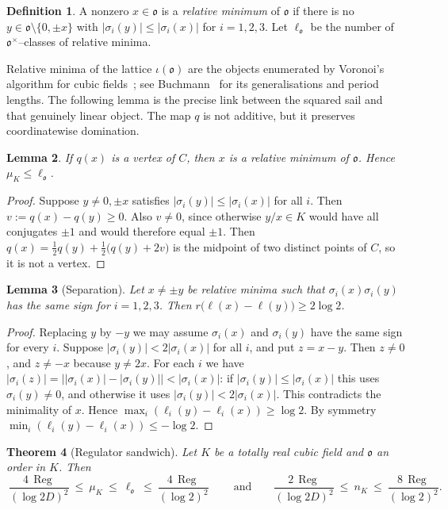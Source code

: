 \documentclass[11pt,reqno]{amsart}
\theoremstyle{plain}
\newtheorem{theorem}{Theorem}[section]
\newtheorem{lemma}[theorem]{Lemma}
\theoremstyle{definition}
\newtheorem{definition}[theorem]{Definition}
\newcommand{\Reg}{\operatorname{Reg}}
\newcommand{\Ok}{\mathfrak{o}}
\newcommand{\nK}{n_K}
\newcommand{\muK}{\mu_K}
\begin{document}
\begin{definition}
A nonzero $x\in\Ok$ is a \emph{relative minimum} of $\Ok$ if there is no $y\in\Ok\setminus\{0,\pm x\}$ with
$|\sigma_i(y)|\le|\sigma_i(x)|$ for $i=1,2,3$. Let $\ell_\Ok$ be the number of $\Ok^\times$--classes of
relative minima.
\end{definition}

Relative minima of the lattice $\iota(\Ok)$ are the objects enumerated by Voronoi's algorithm for cubic
fields~\cite{Voronoi1896,DF}; see Buchmann~\cite{Buchmann85,Buchmann87} for its generalisations and period
lengths. The following lemma is the precise link between the squared sail and that genuinely linear
object. The map $q$ is not additive, but it preserves coordinatewise domination.

\begin{lemma}\label{lem:relmin}
If $q(x)$ is a vertex of $C$, then $x$ is a relative minimum of $\Ok$. Hence $\muK\le\ell_\Ok$.
\end{lemma}

\begin{proof}
Suppose $y\ne0,\pm x$ satisfies $|\sigma_i(y)|\le|\sigma_i(x)|$ for all $i$. Then $v:=q(x)-q(y)\ge0$. Also
$v\neq0$, since otherwise $y/x\in K$ would have all conjugates $\pm1$ and would therefore equal $\pm1$. Then
$q(x)=\tfrac12q(y)+\tfrac12\big(q(y)+2v\big)$ is the midpoint of two distinct points of $C$, so it is not a
vertex.
\end{proof}

\begin{lemma}[Separation]\label{lem:sep}
Let $x\neq\pm y$ be relative minima such that $\sigma_i(x)\sigma_i(y)$ has the same sign for $i=1,2,3$. Then
$r\big(\ell(x)-\ell(y)\big)\ge2\log2$.
\end{lemma}

\begin{proof}
Replacing $y$ by $-y$ we may assume $\sigma_i(x)$ and $\sigma_i(y)$ have the same sign for every $i$.
Suppose $|\sigma_i(y)|<2|\sigma_i(x)|$ for all $i$, and put $z=x-y$. Then $z\ne0$, and $z\neq -x$ because
$y\neq2x$. For each $i$ we have $|\sigma_i(z)|=\big||\sigma_i(x)|-|\sigma_i(y)|\big|<|\sigma_i(x)|$: if
$|\sigma_i(y)|\le|\sigma_i(x)|$ this uses $\sigma_i(y)\ne0$, and otherwise it uses
$|\sigma_i(y)|<2|\sigma_i(x)|$. This contradicts the minimality of $x$. Hence
$\max_i(\ell_i(y)-\ell_i(x))\ge\log2$. By symmetry $\min_i(\ell_i(y)-\ell_i(x))\le-\log2$.
\end{proof}

\begin{theorem}[Regulator sandwich]\label{thm:sandwich}
Let $K$ be a totally real cubic field and $\Ok$ an order in $K$. Then
\[
\boxed{\ \frac{4\,\Reg}{(\log 2D)^2}\ \le\ \muK\ \le\ \ell_\Ok\ \le\ \frac{4\,\Reg}{(\log2)^2}\ }
\qquad\text{and}\qquad
\frac{2\,\Reg}{(\log 2D)^2}\ \le\ \nK\ \le\ \frac{8\,\Reg}{(\log 2)^2}.
\]
\end{theorem}
\end{document}
